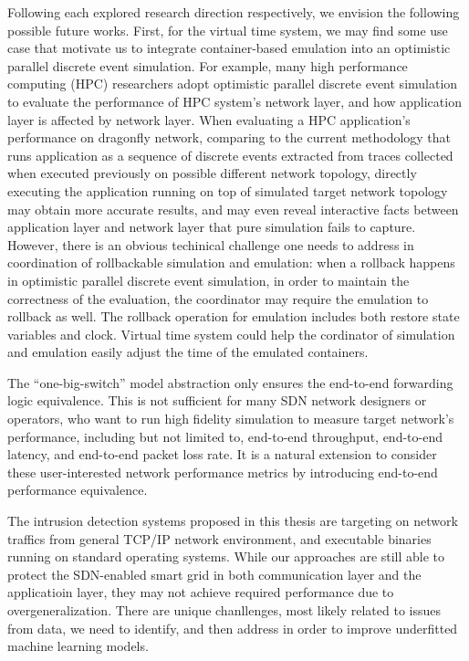 Following each explored research direction respectively, we envision the following possible future works.
First, for the virtual time system, we may find some use case that motivate us to integrate container-based emulation into an optimistic parallel discrete event simulation.
For example, many high performance computing (HPC) researchers adopt optimistic parallel discrete event simulation~\cite{CodesSim}
to evaluate the performance of HPC system's network layer, and how application layer is affected by network layer.
When evaluating a HPC application's performance on dragonfly network,
comparing to the current methodology that runs application as a sequence of discrete events extracted from traces collected when executed previously on possible different network topology,
directly executing the application running on top of simulated target network topology may obtain more accurate results,
and may even reveal interactive facts between application layer and network layer that pure simulation fails to capture.
However, there is an obvious techinical challenge one needs to address in coordination of rollbackable simulation and emulation:
when a rollback happens in optimistic parallel discrete event simulation, in order to maintain the correctness of the evaluation,
the coordinator may require the emulation to rollback as well.
The rollback operation for emulation includes both restore state variables and clock.
Virtual time system could help the cordinator of simulation and emulation easily adjust the time of the emulated containers.

The ``one-big-switch'' model abstraction only ensures the end-to-end forwarding logic equivalence.
This is not sufficient for many SDN network designers or operators, who want to run high fidelity simulation to measure target network's performance,
including but not limited to, end-to-end throughput, end-to-end latency, and end-to-end packet loss rate.
It is a natural extension to consider these user-interested network performance metrics by introducing end-to-end performance equivalence.

The intrusion detection systems proposed in this thesis are targeting on network traffics from general TCP/IP network environment,
and executable binaries running on standard operating systems.
While our approaches are still able to protect the SDN-enabled smart grid in both communication layer and the applicatioin layer,
they may not achieve required performance due to overgeneralization.
There are unique chanllenges, most likely related to issues from data,
we need to identify, and then address in order to improve underfitted machine learning models.

